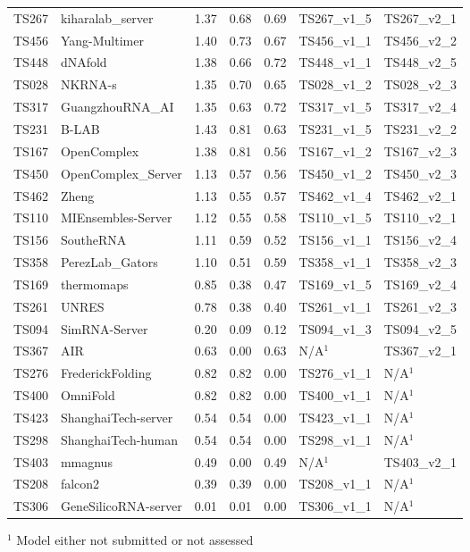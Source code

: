 \begin{table}[ht]
{\begin{tabular}{llrrrll}
TS267 & kiharalab\_server & 1.37 & 0.68 & 0.69 & TS267\_v1\_5 & TS267\_v2\_1 \\ 
TS456 & Yang-Multimer & 1.40 & 0.73 & 0.67 & TS456\_v1\_1 & TS456\_v2\_2 \\ 
TS448 & dNAfold & 1.38 & 0.66 & 0.72 & TS448\_v1\_1 & TS448\_v2\_5 \\ 
TS028 & NKRNA-s & 1.35 & 0.70 & 0.65 & TS028\_v1\_2 & TS028\_v2\_3 \\ 
TS317 & GuangzhouRNA\_AI & 1.35 & 0.63 & 0.72 & TS317\_v1\_5 & TS317\_v2\_4 \\ 
TS231 & B-LAB & 1.43 & 0.81 & 0.63 & TS231\_v1\_5 & TS231\_v2\_2 \\ 
TS167 & OpenComplex & 1.38 & 0.81 & 0.56 & TS167\_v1\_2 & TS167\_v2\_3 \\ 
TS450 & OpenComplex\_Server & 1.13 & 0.57 & 0.56 & TS450\_v1\_2 & TS450\_v2\_3 \\ 
TS462 & Zheng & 1.13 & 0.55 & 0.57 & TS462\_v1\_4 & TS462\_v2\_1 \\ 
TS110 & MIEnsembles-Server & 1.12 & 0.55 & 0.58 & TS110\_v1\_5 & TS110\_v2\_1 \\ 
TS156 & SoutheRNA & 1.11 & 0.59 & 0.52 & TS156\_v1\_1 & TS156\_v2\_4 \\ 
TS358 & PerezLab\_Gators & 1.10 & 0.51 & 0.59 & TS358\_v1\_1 & TS358\_v2\_3 \\ 
TS169 & thermomaps & 0.85 & 0.38 & 0.47 & TS169\_v1\_5 & TS169\_v2\_4 \\ 
TS261 & UNRES & 0.78 & 0.38 & 0.40 & TS261\_v1\_1 & TS261\_v2\_3 \\ 
TS094 & SimRNA-Server & 0.20 & 0.09 & 0.12 & TS094\_v1\_3 & TS094\_v2\_5 \\ 
TS367 & AIR & 0.63 & 0.00 & 0.63 & N/A$^{1}$ & TS367\_v2\_1 \\ 
TS276 & FrederickFolding & 0.82 & 0.82 & 0.00 & TS276\_v1\_1 & N/A$^{1}$ \\ 
TS400 & OmniFold & 0.82 & 0.82 & 0.00 & TS400\_v1\_1 & N/A$^{1}$ \\ 
TS423 & ShanghaiTech-server & 0.54 & 0.54 & 0.00 & TS423\_v1\_1 & N/A$^{1}$ \\ 
TS298 & ShanghaiTech-human & 0.54 & 0.54 & 0.00 & TS298\_v1\_1 & N/A$^{1}$ \\ 
TS403 & mmagnus & 0.49 & 0.00 & 0.49 & N/A$^{1}$ & TS403\_v2\_1 \\ 
TS208 & falcon2 & 0.39 & 0.39 & 0.00 & TS208\_v1\_1 & N/A$^{1}$ \\ 
TS306 & GeneSilicoRNA-server & 0.01 & 0.01 & 0.00 & TS306\_v1\_1 & N/A$^{1}$ \\ 
\bottomrule
\end{tabular}%
}
\begin{flushleft}\footnotesize $^{1}$ Model either not submitted or not assessed\end{flushleft}
\end{table}
